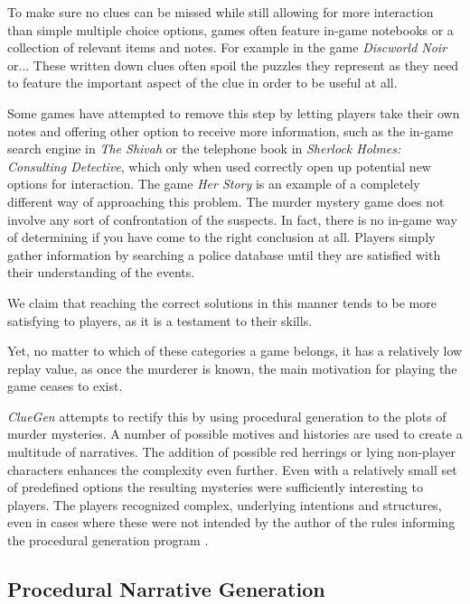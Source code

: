 To make sure no clues can be missed while still allowing for more interaction than simple multiple choice options, games often feature in-game notebooks or a collection of relevant items and notes.
For example in the game \emph{Discworld Noir} or... 
These written down clues often spoil the puzzles they represent as they need to feature the important aspect of the clue in order to be useful at all.

Some games have attempted to remove this step by letting players take their own notes and offering other option to receive more information, such as the in-game search engine in \emph{The Shivah} or the telephone book in \emph{Sherlock Holmes: Consulting Detective}, which only when used correctly open up potential new options for interaction.
The game \emph{Her Story} is an example of a completely different way of approaching this problem.
The murder mystery game does not involve any sort of confrontation of the suspects.
In fact, there is no in-game way of determining if you have come to the right conclusion at all.
Players simply gather information by searching a police database until they are satisfied with their understanding of the events.

We claim that reaching the correct solutions in this manner tends to be more satisfying to players, as it is a testament to their skills.

Yet, no matter to which of these categories a game belongs, it has a relatively low replay value, as once the murderer is known, the main motivation for playing the game ceases to exist.

\emph{ClueGen} attempts to rectify this by using procedural generation to the plots of murder mysteries.
A number of possible motives and histories are used to create a multitude of narratives.
The addition of possible red herrings or lying non-player characters enhances the complexity even further.
Even with a relatively small set of predefined options the resulting mysteries were sufficiently interesting to players.
The players recognized complex, underlying intentions and structures, even in cases where these were not intended by the author of the rules informing the procedural generation program \cite{AIIDE1614070}.

\subsection{Procedural Narrative Generation}

